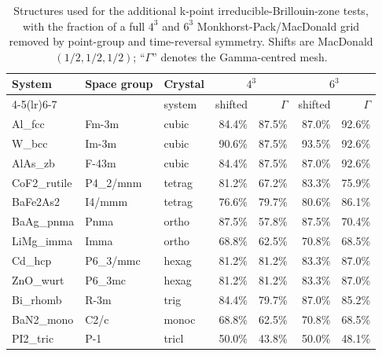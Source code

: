 \begin{table}[htbp]
\centering\small\setlength{\tabcolsep}{4pt}
\caption{Structures used for the additional k-point irreducible-Brillouin-zone tests, with the fraction of a full $4^3$ and $6^3$ Monkhorst-Pack/MacDonald grid removed by point-group and time-reversal symmetry. Shifts are MacDonald $(1/2,1/2,1/2)$; ``$\Gamma$'' denotes the Gamma-centred mesh.}
\label{tab:additional-ibz}
\begin{tabular}{lllrrrr}
\toprule
System & Space group & Crystal & \multicolumn{2}{c}{$4^3$} & \multicolumn{2}{c}{$6^3$} \\
\cmidrule(lr){4-5}\cmidrule(lr){6-7}
 & & system & shifted & $\Gamma$ & shifted & $\Gamma$ \\
\midrule
Al\_fcc & Fm-3m & cubic & 84.4\% & 87.5\% & 87.0\% & 92.6\% \\
W\_bcc & Im-3m & cubic & 90.6\% & 87.5\% & 93.5\% & 92.6\% \\
AlAs\_zb & F-43m & cubic & 84.4\% & 87.5\% & 87.0\% & 92.6\% \\
CoF2\_rutile & P4\_2/mnm & tetrag & 81.2\% & 67.2\% & 83.3\% & 75.9\% \\
BaFe2As2 & I4/mmm & tetrag & 76.6\% & 79.7\% & 80.6\% & 86.1\% \\
BaAg\_pnma & Pnma & ortho & 87.5\% & 57.8\% & 87.5\% & 70.4\% \\
LiMg\_imma & Imma & ortho & 68.8\% & 62.5\% & 70.8\% & 68.5\% \\
Cd\_hcp & P6\_3/mmc & hexag & 81.2\% & 81.2\% & 83.3\% & 87.0\% \\
ZnO\_wurt & P6\_3mc & hexag & 81.2\% & 81.2\% & 83.3\% & 87.0\% \\
Bi\_rhomb & R-3m & trig & 84.4\% & 79.7\% & 87.0\% & 85.2\% \\
BaN2\_mono & C2/c & monoc & 68.8\% & 62.5\% & 70.8\% & 68.5\% \\
PI2\_tric & P-1 & tricl & 50.0\% & 43.8\% & 50.0\% & 48.1\% \\
\bottomrule
\end{tabular}
\end{table}
